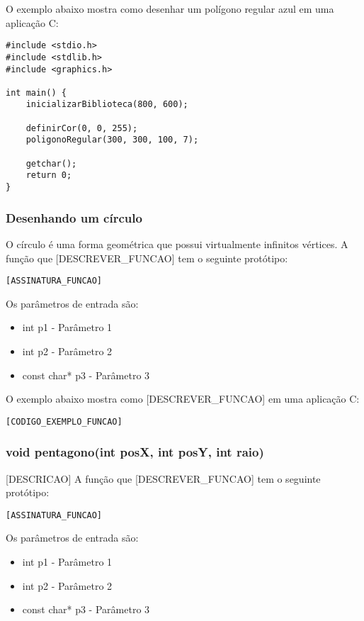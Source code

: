 \documentclass[12pt, %
openright,
oneside, %
a4paper,    %
brazil]{facom-ufu-abntex2}
\begin{document}
O exemplo abaixo mostra como desenhar um polígono regular azul em uma aplicação C:

\begin{lstlisting}
#include <stdio.h>
#include <stdlib.h>
#include <graphics.h>

int main() {
    inicializarBiblioteca(800, 600);

    definirCor(0, 0, 255);
    poligonoRegular(300, 300, 100, 7);

    getchar();
    return 0;
}
\end{lstlisting}

\subsubsection{Desenhando um círculo}
O círculo é uma forma geométrica que possui virtualmente infinitos vértices.
A função que [DESCREVER_FUNCAO] tem o seguinte protótipo:

\begin{lstlisting}
[ASSINATURA_FUNCAO]
\end{lstlisting}

Os parâmetros de entrada são:

\begin{itemize}
    \item int p1 - Parâmetro 1
    \item int p2 - Parâmetro 2
    \item const char* p3 - Parâmetro 3
\end{itemize}

O exemplo abaixo mostra como [DESCREVER_FUNCAO] em uma aplicação C:

\begin{lstlisting}
[CODIGO_EXEMPLO_FUNCAO]
\end{lstlisting}

\subsubsection{void pentagono(int posX, int posY, int raio)}
[DESCRICAO]
A função que [DESCREVER_FUNCAO] tem o seguinte protótipo:

\begin{lstlisting}
[ASSINATURA_FUNCAO]
\end{lstlisting}

Os parâmetros de entrada são:

\begin{itemize}
    \item int p1 - Parâmetro 1
    \item int p2 - Parâmetro 2
    \item const char* p3 - Parâmetro 3
\end{itemize}
\end{document}
